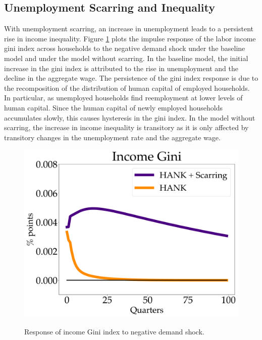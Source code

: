 \subsection{Unemployment Scarring and Inequality}

With unemployment scarring, an increase in unemployment leads to a persistent rise in income inequality. Figure \ref{Gini_IPR} plots the impulse response of the labor income gini index across households to the negative demand shock under the baseline model and under the model without scarring. In the baseline model, the initial increase in the gini index is attributed to the rise in unemployment and the decline in the aggregate wage. The persistence of the gini index response is due to the recomposition of the distribution of human capital of employed households. In particular, as unemployed households find reemployment at lower levels of human capital. Since the human capital of newly employed households accumulates slowly, this causes hysteresis in the gini index. In the model without scarring, the increase in income inequality is transitory as it is only affected by transitory changes in the unemployment rate and the aggregate wage.

\begin{figure}[!h]
   \begin{center}
   \begin{minipage}{0.7\textwidth}
        \centering
        \includegraphics[scale=.3]{text/chapter1/Figures/gini_IPR} %
    \end{minipage}
        \caption{Response of income Gini index to negative demand shock.}
    \label{Gini_IPR}
    \end{center}
  \end{figure}




